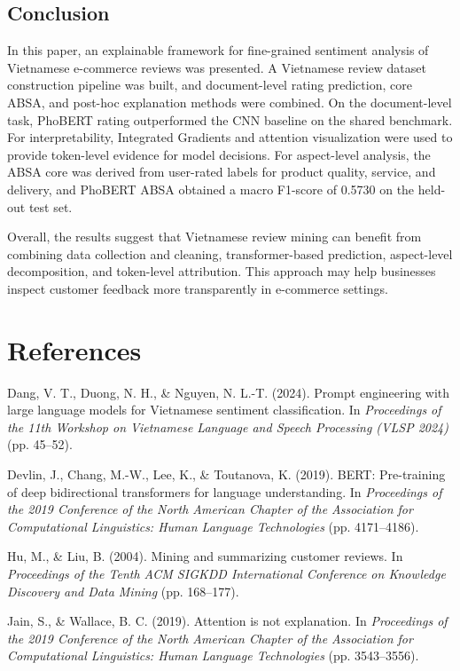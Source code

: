\documentclass[a4paper,12pt]{extarticle}
\begin{document}
\subsection{Conclusion}


In this paper, an explainable framework for fine-grained sentiment analysis of Vietnamese e-commerce reviews was presented. A Vietnamese review dataset construction pipeline was built, and document-level rating prediction, core ABSA, and post-hoc explanation methods were combined. On the document-level task, PhoBERT rating outperformed the CNN baseline on the shared benchmark. For interpretability, Integrated Gradients and attention visualization were used to provide token-level evidence for model decisions. For aspect-level analysis, the ABSA core was derived from user-rated labels for product quality, service, and delivery, and PhoBERT ABSA obtained a macro F1-score of 0.5730 on the held-out test set.

Overall, the results suggest that Vietnamese review mining can benefit from combining data collection and cleaning, transformer-based prediction, aspect-level decomposition, and token-level attribution. This approach may help businesses inspect customer feedback more transparently in e-commerce settings.


\section*{References}


Dang, V. T., Duong, N. H., \& Nguyen, N. L.-T. (2024). Prompt engineering with large language models for Vietnamese sentiment classification. In \textit{Proceedings of the 11th Workshop on Vietnamese Language and Speech Processing (VLSP 2024)} (pp. 45--52).


Devlin, J., Chang, M.-W., Lee, K., \& Toutanova, K. (2019). BERT: Pre-training of deep bidirectional transformers for language understanding. In \textit{Proceedings of the 2019 Conference of the North American Chapter of the Association for Computational Linguistics: Human Language Technologies} (pp. 4171--4186).

Hu, M., \& Liu, B. (2004). Mining and summarizing customer reviews. In \textit{Proceedings of the Tenth ACM SIGKDD International Conference on Knowledge Discovery and Data Mining} (pp. 168--177).

Jain, S., \& Wallace, B. C. (2019). Attention is not explanation. In \textit{Proceedings of the 2019 Conference of the North American Chapter of the Association for Computational Linguistics: Human Language Technologies} (pp. 3543--3556).
\end{document}
